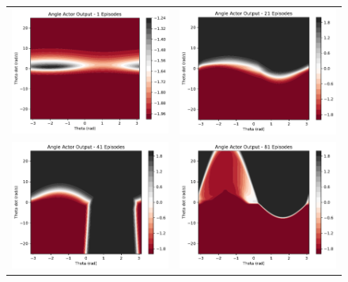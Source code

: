 \begin{figure}[H]
	\begin{tabular}{cc}
		\includegraphics[width=65mm]{figures/train_figs/angle_actor/Actor0_1.pdf} &  
		\includegraphics[width=65mm]{figures/train_figs/angle_actor/Actor0_21.pdf} \\
		\includegraphics[width=65mm]{figures/train_figs/angle_actor/Actor0_41.pdf} &   \includegraphics[width=65mm]{figures/train_figs/angle_actor/Actor0_81.pdf} \\

\end{tabular}
\end{figure}
